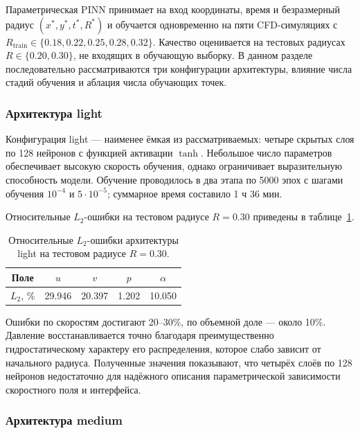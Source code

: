 \documentclass[12pt,a4paper]{article}
\begin{document}
Параметрическая PINN принимает на вход координаты, время и безразмерный
радиус \((x^*,y^*,t^*,R^*)\) и обучается одновременно на пяти CFD-симуляциях
с \(R_{\mathrm{train}}\in\{0.18,0.22,0.25,0.28,0.32\}\). Качество оценивается
на тестовых радиусах \(R\in\{0.20,0.30\}\), не входящих в обучающую выборку.
В данном разделе последовательно рассматриваются три конфигурации архитектуры,
влияние числа стадий обучения и аблация числа обучающих точек.

\subsubsection{Архитектура light}

Конфигурация light --- наименее ёмкая из рассматриваемых: четыре скрытых
слоя по 128 нейронов с функцией активации \(\tanh\). Небольшое число
параметров обеспечивает высокую скорость обучения, однако ограничивает
выразительную способность модели. Обучение проводилось в два этапа по 5000
эпох с шагами обучения \(10^{-4}\) и \(5\cdot10^{-5}\); суммарное время
составило 1 ч 36 мин.

Относительные \(L_2\)-ошибки на тестовом радиусе \(R=0.30\) приведены в
таблице~\ref{tab:light_errors}.

\begin{table}[H]
    \centering
    \begin{tabular}{c|cccc}
        \hline
        Поле & \(u\) & \(v\) & \(p\) & \(\alpha\) \\
        \hline
        \(L_2\), \% & 29.946 & 20.397 & 1.202 & 10.050 \\
        \hline
    \end{tabular}
    \caption{Относительные \(L_2\)-ошибки архитектуры light на тестовом радиусе \(R=0.30\).}
    \label{tab:light_errors}
\end{table}

Ошибки по скоростям достигают 20--30\%, по объемной доле --- около 10\%.
Давление восстанавливается точно благодаря преимущественно гидростатическому
характеру его распределения, которое слабо зависит от начального радиуса.
Полученные значения показывают, что четырёх слоёв по 128 нейронов недостаточно
для надёжного описания параметрической зависимости скоростного поля и
интерфейса.

\subsubsection{Архитектура medium}
\end{document}
